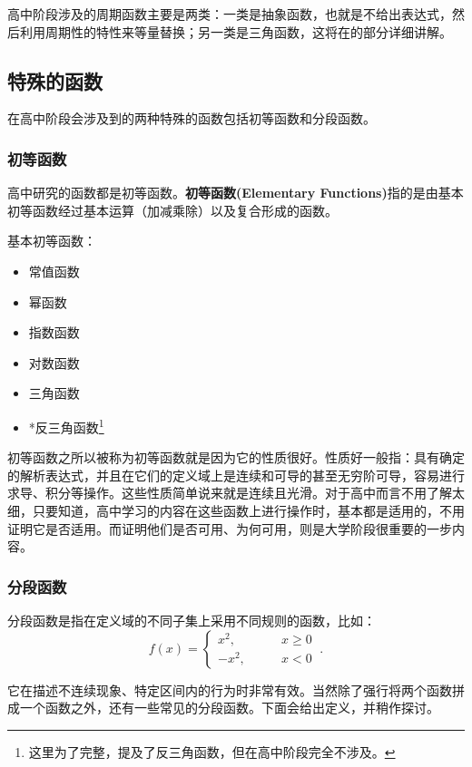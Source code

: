 高中阶段涉及的周期函数主要是两类：一类是抽象函数，也就是不给出表达式，然后利用周期性的特性来等量替换；另一类是三角函数，这将在的部分详细讲解。

\subsection{特殊的函数}

在高中阶段会涉及到的两种特殊的函数包括初等函数和分段函数。

\subsubsection{初等函数}

高中研究的函数都是初等函数。\textbf{初等函数(Elementary Functions)}指的是由基本初等函数经过基本运算（加减乘除）以及复合形成的函数。

基本初等函数：
\begin{itemize}
\item 常值函数
\item 幂函数
\item 指数函数
\item 对数函数
\item 三角函数
\item *反三角函数\footnote{这里为了完整，提及了反三角函数，但在高中阶段完全不涉及。}
\end{itemize}

初等函数之所以被称为初等函数就是因为它的性质很好。性质好一般指：具有确定的解析表达式，并且在它们的定义域上是连续和可导的甚至无穷阶可导，容易进行求导、积分等操作。这些性质简单说来就是连续且光滑。对于高中而言不用了解太细，只要知道，高中学习的内容在这些函数上进行操作时，基本都是适用的，不用证明它是否适用。而证明他们是否可用、为何可用，则是大学阶段很重要的一步内容。

\subsubsection{分段函数}

分段函数是指在定义域的不同子集上采用不同规则的函数，比如：
$$f(x) =
\begin{cases}
x^2,\qquad&x \geq 0 \\
-x^2,\qquad&x < 0
\end{cases}~.$$

它在描述不连续现象、特定区间内的行为时非常有效。当然除了强行将两个函数拼成一个函数之外，还有一些常见的分段函数。下面会给出定义，并稍作探讨。

